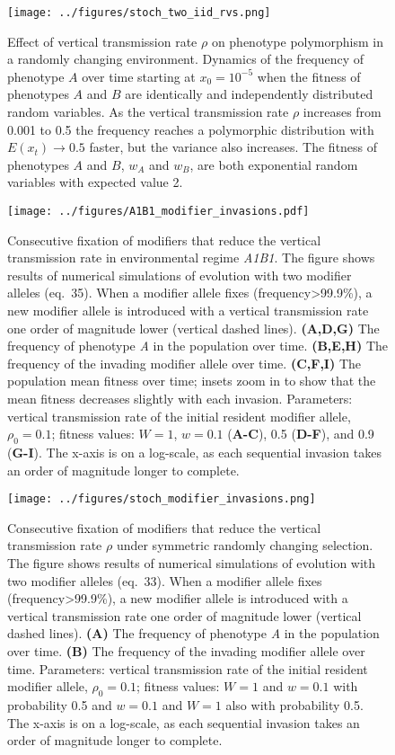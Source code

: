 \documentclass[]{article}
\begin{document}
\begin{figure}
\centering
\texttt{[image: ../figures/stoch\_two\_iid\_rvs.png]}
\caption{Effect of vertical transmission rate $\rho$ on phenotype polymorphism in a randomly changing environment. Dynamics of the frequency of phenotype \(A\) over time starting at \(x_0=10^{-5}\) when the fitness of phenotypes \(A\) and \(B\) are identically and independently distributed random variables.
As the vertical transmission rate \(\rho\) increases from 0.001 to 0.5 the frequency reaches a polymorphic distribution with \(E(x_t)\to0.5\) faster,
but the variance also increases.
The fitness of phenotypes \(A\) and \(B\), \(w_A\) and \(w_B\), are both exponential random variables with expected value 2.}\label{fig:stoch_two_iid_rvs}
\end{figure}

\begin{figure}
\centering
\texttt{[image: ../figures/A1B1\_modifier\_invasions.pdf]}
\caption{Consecutive fixation of modifiers that reduce the vertical
transmission rate in environmental regime \emph{A1B1}. The figure shows
results of numerical simulations of evolution with two modifier alleles
(eq.\ 35). When a modifier allele fixes
(frequency\textgreater{}99.9\%), a new modifier allele is introduced
with a vertical transmission rate one order of magnitude lower (vertical
dashed lines). \textbf{(A,D,G)} The frequency of phenotype \emph{A} in
the population over time. \textbf{(B,E,H)} The frequency of the invading
modifier allele over time. \textbf{(C,F,I)} The population mean
fitness over time; insets zoom in to show that the mean fitness 
decreases slightly with each invasion. Parameters: vertical transmission rate of
the initial resident modifier allele, \(\rho_0 =0.1\); fitness values:
$W=1$, $w=0.1$ (\textbf{A-C}), 0.5 (\textbf{D-F}), and 0.9
(\textbf{G-I}). The x-axis is on a log-scale, as each sequential invasion
takes an order of magnitude longer to
complete.}\label{fig:A1B1_modifier_invasions}
\end{figure}

\begin{figure}
\centering
\texttt{[image: ../figures/stoch\_modifier\_invasions.png]}
\caption{Consecutive fixation of modifiers that reduce the vertical
transmission rate $\rho$ under symmetric randomly changing selection. The figure shows
results of numerical simulations of evolution with two modifier alleles
(eq.\ 33). When a modifier allele fixes
(frequency\textgreater{}99.9\%), a new modifier allele is introduced
with a vertical transmission rate one order of magnitude lower (vertical
dashed lines). \textbf{(A)} The frequency of phenotype \emph{A} in the
population over time. \textbf{(B)} The frequency of the invading
modifier allele over time. Parameters: vertical transmission rate of the initial
resident modifier allele, \(\rho_0 =0.1\); fitness values: $W=1$
and $w=0.1$ with probability 0.5 and $w=0.1$ and $W=1$
also with probability 0.5. The x-axis is on a log-scale, as each sequential invasion takes
an order of magnitude longer to
complete.}\label{fig:stoch_modifier_invasions}
\end{figure}
\end{document}
